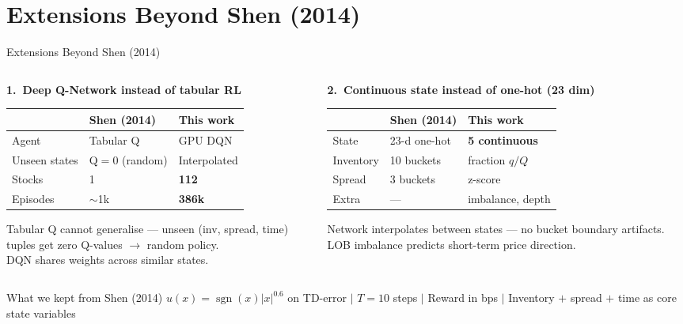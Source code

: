 \documentclass[aspectratio=169, 10pt]{beamer}
\begin{document}
\section{Extensions Beyond Shen (2014)}

\begin{frame}{Extensions Beyond Shen (2014)}
  \begin{columns}[T]
    \begin{column}{0.48\textwidth}
      \textbf{1.\ Deep Q-Network instead of tabular RL}

      \smallskip
      \begin{tabular}{lll}
        \toprule
        & Shen (2014) & This work \\
        \midrule
        Agent   & Tabular Q    & GPU DQN \\
        Unseen states & Q$=0$ (random) & Interpolated \\
        Stocks  & 1            & \textbf{112} \\
        Episodes & $\sim$1k   & \textbf{386k} \\
        \bottomrule
      \end{tabular}

      \smallskip
      \footnotesize
      Tabular Q cannot generalise — unseen (inv, spread, time)\\
      tuples get zero Q-values $\to$ random policy.\\
      DQN shares weights across similar states.
    \end{column}
    \begin{column}{0.48\textwidth}
      \textbf{2.\ Continuous state instead of one-hot (23 dim)}

      \smallskip
      \begin{tabular}{lll}
        \toprule
        & Shen (2014) & This work \\
        \midrule
        State   & 23-d one-hot & \textbf{5 continuous} \\
        Inventory & 10 buckets & fraction $q/Q$ \\
        Spread  & 3 buckets   & z-score \\
        Extra   & —           & imbalance, depth \\
        \bottomrule
      \end{tabular}

      \smallskip
      \footnotesize
      Network interpolates between states — no bucket boundary artifacts.\\
      LOB imbalance predicts short-term price direction.
    \end{column}
  \end{columns}

  \bigskip
  \begin{block}{What we kept from Shen (2014)}
    \small
    $u(x){=}\operatorname{sgn}(x)|x|^{0.6}$ on TD-error \quad$|$\quad
    $T{=}10$ steps \quad$|$\quad
    Reward in bps \quad$|$\quad
    Inventory $+$ spread $+$ time as core state variables
  \end{block}
\end{frame}
\end{document}

